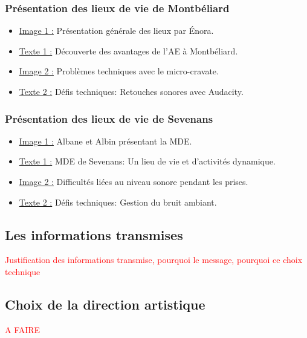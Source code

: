 \subsubsection{Présentation des lieux de vie de Montbéliard}
\begin{itemize}
    \item \underline{Image 1 :} Présentation générale des lieux par Énora.
    \item \underline{Texte 1 :} \og Découverte des avantages de l'AE à Montbéliard. \fg{}
    \item \underline{Image 2 :} Problèmes techniques avec le micro-cravate.
    \item \underline{Texte 2 :} \og Défis techniques: Retouches sonores avec Audacity. \fg{}
\end{itemize}

\subsubsection{Présentation des lieux de vie de Sevenans}
\begin{itemize}
    \item \underline{Image 1 :} Albane et Albin présentant la MDE.
    \item \underline{Texte 1 :} \og MDE de Sevenans: Un lieu de vie et d’activités dynamique. \fg{}
    \item \underline{Image 2 :} Difficultés liées au niveau sonore pendant les prises.
    \item \underline{Texte 2 :} \og Défis techniques: Gestion du bruit ambiant. \fg{}
\end{itemize}





\subsection{Les informations transmises}\label{subsec:les-informations-transmises}

\textcolor{red}{Justification des informations transmise, pourquoi le message, pourquoi ce choix technique}


\subsection{Choix de la direction artistique}\label{subsec:choix-de-la-direction-artistique}


\textcolor{red}{A FAIRE}




